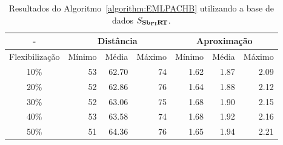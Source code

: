 \begin{table}[!htb]
  \caption{Resultados do Algoritmo~\ref{algorithm:EMLPACHB} utilizando a base de dados $S_{\textbf{Sb\textsubscript{FI}RT}}{}$.}
  \label{table:HQMTSFGN}
  \centering
  \begin{tabular}{|c|r|r|r|r|r|r|}
    \hline
      -            & \multicolumn{3}{c|}{Distância}             & \multicolumn{3}{c|}{Aproximação}           \\ \hline
    Flexibilização & Mínimo       & Média        & Máximo       & Mínimo       & Média        & Máximo       \\ \hline  
    10\%           & 53           & 62.70        & 74           & 1.62         & 1.87         & 2.09         \\ \hline
    20\%           & 52           & 62.86        & 76           & 1.64         & 1.88         & 2.12         \\ \hline
    30\%           & 52           & 63.06        & 75           & 1.68         & 1.90         & 2.15         \\ \hline
    40\%           & 53           & 63.58        & 74           & 1.68         & 1.92         & 2.16         \\ \hline
    50\%           & 51           & 64.36        & 76           & 1.65         & 1.94         & 2.21         \\ \hline    
  \end{tabular}
\end{table}